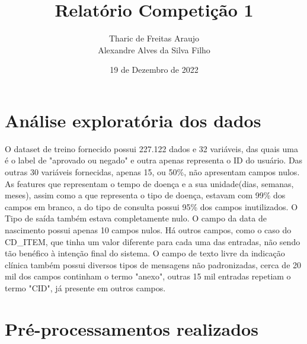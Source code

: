 \documentclass{article}
\title{Relatório Competição 1}
\author{Tharic de Freitas Araujo \\
        Alexandre Alves da Silva Filho}
\date{19 de Dezembro de 2022}
\begin{document}
\maketitle

\section{Análise exploratória dos dados}
O dataset de treino fornecido possui 227.122 dados e 32 variáveis, das quais uma é o label de "aprovado ou negado" e outra apenas representa o ID do usuário. Das outras 30 variáveis fornecidas, apenas 15, ou 50\%, não apresentam campos nulos. As features que representam o tempo de doença e a sua unidade(dias, semanas, meses), assim como a que representa o tipo de doença, estavam com 99\% dos campos em branco, a do tipo de consulta possui 95\% dos campos inutilizados. O Tipo de saída também estava completamente nulo. O campo da data de nascimento possui apenas 10 campos nulos. Há outros campos, como o caso do CD\_ITEM, que tinha um valor diferente para cada uma das entradas, não sendo tão benéfico à intenção final do sistema. O campo de texto livre da indicação clínica também possui diversos tipos de mensagens não padronizadas, cerca de 20 mil dos campos continham o termo "anexo", outras 15 mil entradas repetiam o termo "CID", já presente em outros campos. 


\section{Pré-processamentos realizados}
\end{document}
